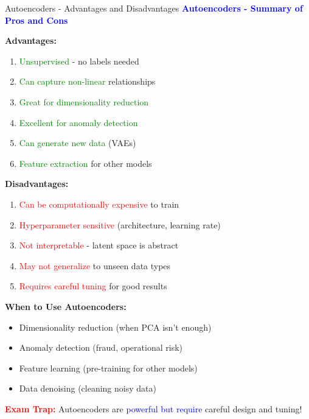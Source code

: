 \documentclass[8pt]{beamer}
\begin{document}
	\begin{frame}{Autoencoders - Advantages and Disadvantages}
		\fontsize{6.5}{7.5}\selectfont
		\textcolor{blue}{\textbf{Autoencoders - Summary of Pros and Cons}}
		
		\textbf{Advantages:}
		\begin{enumerate}
			\item \textcolor{green}{Unsupervised} - no labels needed
			\item \textcolor{green}{Can capture non-linear} relationships
			\item \textcolor{green}{Great for dimensionality reduction}
			\item \textcolor{green}{Excellent for anomaly detection}
			\item \textcolor{green}{Can generate new data} (VAEs)
			\item \textcolor{green}{Feature extraction} for other models
		\end{enumerate}
		
		\textbf{Disadvantages:}
		\begin{enumerate}
			\item \textcolor{red}{Can be computationally expensive} to train
			\item \textcolor{red}{Hyperparameter sensitive} (architecture, learning rate)
			\item \textcolor{red}{Not interpretable} - latent space is abstract
			\item \textcolor{red}{May not generalize} to unseen data types
			\item \textcolor{red}{Requires careful tuning} for good results
		\end{enumerate}
		
		\textbf{When to Use Autoencoders:}
		\begin{itemize}
			\item Dimensionality reduction (when PCA isn't enough)
			\item Anomaly detection (fraud, operational risk)
			\item Feature learning (pre-training for other models)
			\item Data denoising (cleaning noisy data)
		\end{itemize}
		
		\textcolor{red}{\textbf{Exam Trap:}} Autoencoders are \textcolor{blue}{powerful but require} careful design and tuning!
	\end{frame}
	
\end{document}
